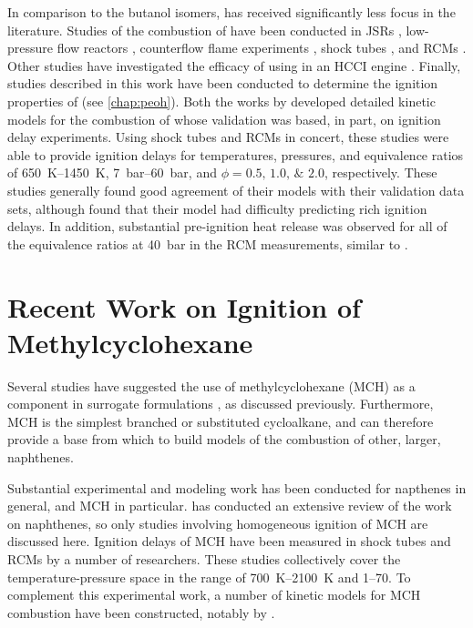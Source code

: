 \documentclass[../main.tex]{subfiles}
\begin{document}
In comparison to the butanol isomers, \iPeOH{} has received significantly
less focus in the literature. Studies of the combustion of \iPeOH{}
have been conducted in JSRs \cite{Dayma2011,Togbe2011,Sarathy2013}, low-pressure flow
reactors \cite{Welz2012}, counterflow flame experiments \cite{Sarathy2013},
shock tubes \cite{Sarathy2013, Tsujimura2012, Tang2013}, and RCMs
\cite{Sarathy2013, Tsujimura2012}. Other studies have investigated
the efficacy of using \iPeOH{} in an HCCI engine \cite{Tsujimura2011,
Yacoub1998, Yang2010}. Finally, studies described in this work have
been conducted to determine the ignition properties of \iPeOH{} (see \autoref{chap:peoh}).
Both the works by \textcite{Tsujimura2012, Sarathy2013} developed
detailed kinetic models for the combustion of \iPeOH{} whose validation
was based, in part, on ignition delay experiments. Using shock tubes and
RCMs in concert, these studies were able to provide ignition delays
for temperatures, pressures, and equivalence ratios of
\SIrange{650}{1450}{\kelvin}, \SIrange{7}{60}{\bar}, and $\phi =
\numlist{0.5;1.0;2.0}$, respectively. These studies generally found good
agreement of their models with their validation data sets, although
\textcite{Sarathy2013} found that their model had difficulty predicting
rich ignition delays. In addition, substantial pre-ignition heat release
was observed for all of the equivalence ratios at \SI{40}{\bar} in the
RCM measurements, similar to \tBuOH{}.

\section{Recent Work on Ignition of Methylcyclohexane}

Several studies have suggested the use of methylcyclohexane (MCH) as a
component in surrogate formulations \cite{Bieleveld2009,Naik2005}, as
discussed previously. Furthermore, MCH is the simplest branched or
substituted cycloalkane, and can therefore provide a base from which
to build models of the combustion of other, larger, naphthenes.

Substantial experimental and modeling work has been conducted for
napthenes in general, and MCH in particular. \textcite{Pitz2011} has
conducted an extensive review of the work on naphthenes, so only studies
involving homogeneous ignition of MCH are discussed here. Ignition delays of MCH
have been measured in shock tubes \cite{Rotavera2013, Vasu2009,
Vanderover2009, Hawthorn1966, Orme2006, Hong2011} and RCMs \cite{Tanaka2003,
Pitz2007, Mittal2009} by a number of researchers. These studies collectively
cover the temperature-pressure space in the range of \SIrange{700}{2100}{\kelvin}
and \SIrange{1}{70}{\atmosphere}. To complement this experimental work, a number
of kinetic models for MCH combustion have been constructed, notably by
\textcite{Orme2006, Pitz2007}.
\end{document}
